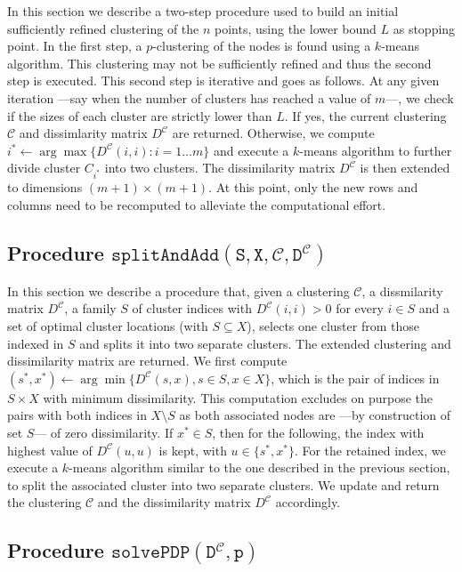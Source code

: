 \documentclass[a4paper,10pt]{article}
\newcommand{\mC}{\mathcal{C}}
\newcommand{\DmC}{D^{\mC}}
\newcommand{\splitadd}[4]{$\mathtt{splitAndAdd({#1}, {#2}, {#3}, {#4})}$}
\newcommand{\solvePDP}[2]{$\mathtt{solvePDP({#1}, {#2})}$}
\begin{document}
In this section we describe a two-step procedure used to build an initial sufficiently refined clustering of the $n$ points, using the lower bound $L$ as stopping point. In the first step, a $p$-clustering of the nodes is found using a $k$-means algorithm. This clustering may not be sufficiently refined and thus the second step is executed. This second step is iterative and goes as follows. At any given iteration ---say when the number of clusters has reached a value of $m$---, we check if the sizes of each cluster are strictly lower than $L$. If yes, the current clustering $\mC$ and dissimlarity matrix $\DmC$ are returned. Otherwise, we compute $i^*\leftarrow\arg\max\{\DmC(i, i): i = 1\ldots m\}$ and execute a $k$-means algorithm to further divide cluster $C_{i^*}$ into two clusters. The dissimilarity matrix $\DmC$ is then extended to dimensions $(m + 1)\times (m + 1)$. At this point, only the new rows and columns need to be recomputed to alleviate the computational effort.

\subsection{Procedure \splitadd{S}{X}{\mC}{\DmC}\label{section:decrclust:splitadd}}

In this section we describe a procedure that, given a clustering $\mC$, a dissmilarity matrix $\DmC$, a family $S$ of cluster indices with $\DmC(i, i) > 0$ for every $i\in S$ and a set of optimal cluster locations (with $S\subseteq X$), selects one cluster from those indexed in $S$ and splits it into two separate clusters. The extended clustering and dissimilarity matrix are returned. We first compute $(s^*, x^*)\leftarrow\arg\min\{\DmC(s, x), s\in S, x\in X\}$, which is the pair of indices in $S\times X$ with minimum dissimilarity. This computation excludes on purpose the pairs with both indices in $X\setminus S$ as both associated nodes are ---by construction of set $S$--- of zero dissimilarity. If $x^*\in S$, then for the following, the index with highest value of $\DmC(u, u)$ is kept, with $u \in \{s^*, x^*\}$. For the retained index, we execute a $k$-means algorithm similar to the one described in the previous section, to split the associated cluster into two separate clusters. We update and return the clustering $\mC$ and the dissimilarity matrix $\DmC$ accordingly.

\subsection{Procedure \solvePDP{\DmC}{p}\label{section:decrclust:solvepdp}}
\end{document}
